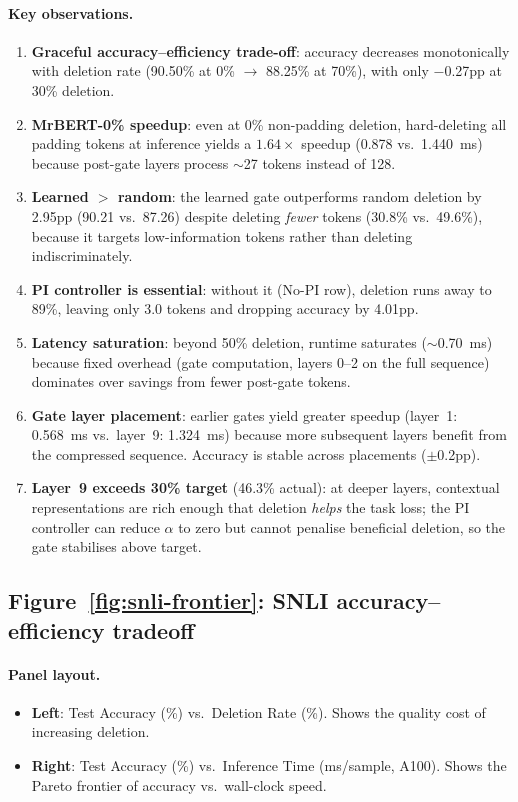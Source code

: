 \documentclass{article} %
\begin{document}
\paragraph{Key observations.}
\begin{enumerate}[nosep]
    \item \textbf{Graceful accuracy--efficiency trade-off}: accuracy decreases monotonically with deletion rate (90.50\% at 0\% $\to$ 88.25\% at 70\%), with only $-$0.27pp at 30\% deletion.
    \item \textbf{MrBERT-0\% speedup}: even at 0\% non-padding deletion, hard-deleting all padding tokens at inference yields a $1.64\times$ speedup (0.878 vs.\ 1.440~ms) because post-gate layers process $\sim$27 tokens instead of 128.
    \item \textbf{Learned $>$ random}: the learned gate outperforms random deletion by 2.95pp (90.21 vs.\ 87.26) despite deleting \emph{fewer} tokens (30.8\% vs.\ 49.6\%), because it targets low-information tokens rather than deleting indiscriminately.
    \item \textbf{PI controller is essential}: without it (No-PI row), deletion runs away to 89\%, leaving only 3.0 tokens and dropping accuracy by 4.01pp.
    \item \textbf{Latency saturation}: beyond 50\% deletion, runtime saturates ($\sim$0.70~ms) because fixed overhead (gate computation, layers 0--2 on the full sequence) dominates over savings from fewer post-gate tokens.
    \item \textbf{Gate layer placement}: earlier gates yield greater speedup (layer~1: 0.568~ms vs.\ layer~9: 1.324~ms) because more subsequent layers benefit from the compressed sequence. Accuracy is stable across placements ($\pm$0.2pp).
    \item \textbf{Layer~9 exceeds 30\% target} (46.3\% actual): at deeper layers, contextual representations are rich enough that deletion \emph{helps} the task loss; the PI controller can reduce $\alpha$ to zero but cannot penalise beneficial deletion, so the gate stabilises above target.
\end{enumerate}

\subsection{Figure~\ref{fig:snli-frontier}: SNLI accuracy--efficiency tradeoff}

\paragraph{Panel layout.}
\begin{itemize}[nosep]
    \item \textbf{Left}: Test Accuracy (\%) vs.\ Deletion Rate (\%). Shows the quality cost of increasing deletion.
    \item \textbf{Right}: Test Accuracy (\%) vs.\ Inference Time (ms/sample, A100). Shows the Pareto frontier of accuracy vs.\ wall-clock speed.
\end{itemize}
\end{document}
